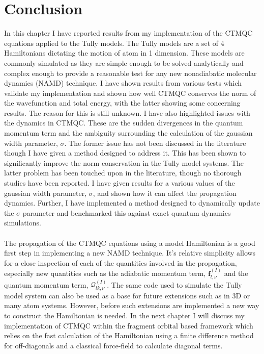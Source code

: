 \section{Conclusion}
In this chapter I have reported results from my implementation of the CTMQC equations applied to the Tully models. The Tully models are a set of 4 Hamiltonians dictating the motion of  atom in 1 dimension. These models are commonly simulated as they are simple enough to be solved analytically and complex enough to provide a reasonable test for any new nonadiabatic molecular dynamics (NAMD) technique. I have shown results from various tests which validate my implementation and shown how well CTMQC conserves the norm of the wavefunction and total energy, with the latter showing some concerning results. The reason for this is still unknown. I have also highlighted  issues with the dynamics in CTMQC. These are the sudden divergences in the quantum momentum term and the ambiguity surrounding the calculation of the gaussian width parameter, $\sigma$. The former issue has not been discussed in the literature  though I have given a method designed to address it. This has been shown to significantly improve the norm conservation in the Tully model systems. The latter problem has been touched upon in the literature, though no thorough studies have been reported. I have given results for a various values of the gaussian width parameter, $\sigma$, and shown how it can affect the propagation dynamics. Further, I have implemented a method designed to dynamically update the $\sigma$ parameter and benchmarked this against exact quantum dynamics simulations.
\\\\
The propagation of the CTMQC equations using a model Hamiltonian is a good first step in implementing a new NAMD technique. It's relative simplicity allows for a close inspection of each of the quantities involved in the propagation, especially new quantities such as the adiabatic momentum term, $\mathbf{f}_{l, \nu}^{(I)}$ and the quantum momentum term, $\mathcal{Q}_{lk, \nu}^{(I)}$. The same code used to simulate the Tully model system can also be used as a base for future extensions such as in 3D or many atom systems. However, before such extensions are implemented a new way to construct the Hamiltonian is needed. In the next chapter I will discuss my implementation of CTMQC within the fragment orbital based framework which relies on the fast calculation of the Hamiltonian using a finite difference method for off-diagonals and a classical force-field to calculate diagonal terms. 



